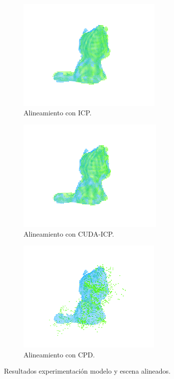\begin{figure}[h]
\begin{subfigure}[t]{0.33\textheight}
    	\centering
        \includegraphics[height=5.5cm]{archivos/experimentacion-1-alineado-icp.png}
        \caption{Alineamiento con ICP.}
        \label{fig:experimentacion-1-alineado-icp}
    \end{subfigure}
    \begin{subfigure}[t]{0.33\textheight}
    	\centering
        \includegraphics[height=5.5cm]{archivos/experimentacion-1-alineado-cuda.png}
        \caption{Alineamiento con CUDA-ICP.}
        \label{fig:experimentacion-1-alineado-cuda}
    \end{subfigure}
    \begin{subfigure}[t]{0.33\textheight}
    	\centering
        \includegraphics[height=5.5cm]{archivos/experimentacion-1-alineado-cpd.png}
        \caption{Alineamiento con CPD.}
        \label{fig:experimentacion-1-alineado-cpd}
    \end{subfigure}
    \caption{Resultados experimentación modelo y escena alineados.}
    \label{fig:experimentacion-1}
\end{figure}

